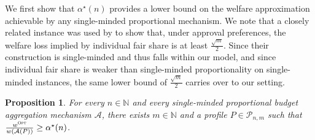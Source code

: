 \documentclass[11pt]{article}
\newcommand{\A}{\mathcal{A}}
\newcommand{\N}{\mathbb{N}}
\newcommand{\opt}{\textsc{Opt}}
\newtheorem{proposition}{Proposition}
\begin{document}
We first show that $\alpha^\star(n)$ provides a lower bound on the welfare approximation achievable by any single-minded proportional mechanism.
We note that a closely related instance was used by \citet[Theorem 1]{MPS20a} to show that, under approval preferences, the welfare loss implied by individual fair share is at least $\frac{\sqrt{m}}{2}$. Since their construction is single-minded and thus falls within our model, and since individual fair share is weaker than single-minded proportionality on single-minded instances, the same lower bound of $\frac{\sqrt{m}}{2}$ carries over to our setting.



\begin{proposition} \label{prop:proportional_social_welfare_lower_bound}
    For every $n\in \N$ and every single-minded proportional budget aggregation mechanism $\A$, there exists $m\in \N$ and a profile $P\in \mathcal{P}_{n,m}$ such that $\frac{w^\opt}{w(\A(P))} \ge \alpha^\star(n)$. %
\end{proposition}
\end{document}
